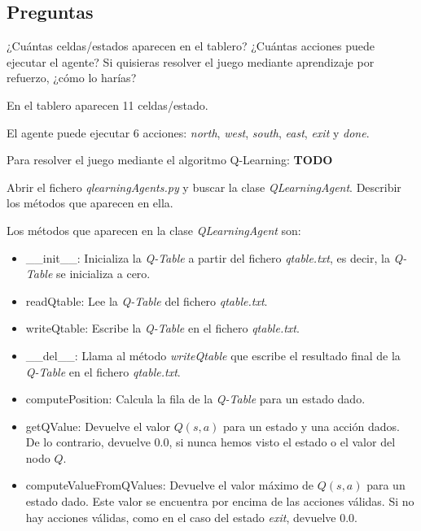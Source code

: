 \documentclass[11pt]{exam}
\begin{document}
\subsection*{Preguntas}

\begin{questions}
	
{ \question ¿Cuántas celdas/estados aparecen en el tablero? ¿Cuántas acciones puede ejecutar el agente? Si quisieras resolver el juego mediante aprendizaje por refuerzo, ¿cómo lo harías? 
}

En el tablero aparecen 11 celdas/estado.

El agente puede ejecutar 6 acciones: \textit{north}, \textit{west}, \textit{south}, \textit{east}, \textit{exit} y \textit{done}.

Para resolver el juego mediante el algoritmo Q-Learning: \textbf{TODO}

{ \question Abrir el fichero \textit{qlearningAgents.py} y buscar la clase \textit{QLearningAgent}. Describir los métodos que aparecen en ella.
}

Los métodos que aparecen en la clase \textit{QLearningAgent} son:

\begin{itemize}
	\item \_\_init\_\_: Inicializa la \textit{Q-Table} a partir del fichero \textit{qtable.txt}, es decir, la \textit{Q-Table} se inicializa a cero.
	
	\item readQtable: Lee la \textit{Q-Table} del fichero \textit{qtable.txt}.
	
	\item writeQtable: Escribe la \textit{Q-Table} en el fichero \textit{qtable.txt}.
	
	\item \_\_del\_\_: Llama al método \textit{writeQtable} que escribe el resultado final de la \textit{Q-Table} en el fichero \textit{qtable.txt}.
	
	\item computePosition: Calcula la fila de la \textit{Q-Table} para un estado dado.
	
	\item getQValue: Devuelve el valor $Q(s,a)$ para un estado y una acción dados. De lo contrario, devuelve 0.0, si nunca hemos visto el estado o el valor del nodo $Q$.
	
	\item computeValueFromQValues: Devuelve el valor máximo de $Q(s,a)$ para un estado dado. Este valor se encuentra por encima de las acciones válidas. Si no hay acciones válidas, como en el caso del estado \textit{exit}, devuelve 0.0.
	

\end{itemize}
\end{questions}
\end{document}

